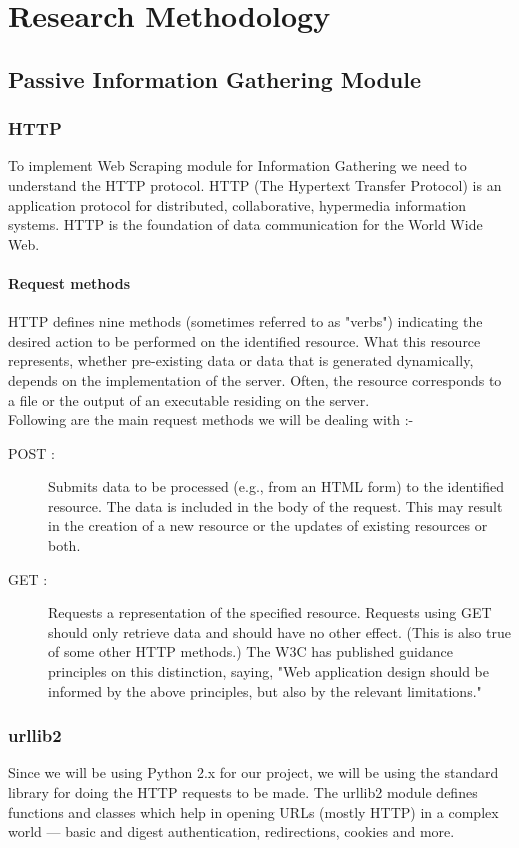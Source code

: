 \chapter{Research Methodology}

\section{Passive Information Gathering Module}

\subsection{HTTP}
To implement Web Scraping module for Information Gathering we need to understand the HTTP protocol. HTTP (The Hypertext Transfer 
Protocol) is an application protocol for distributed, collaborative, hypermedia information systems. HTTP is the 
foundation of data communication for the World Wide Web.

\subsubsection{Request methods}
HTTP defines nine methods (sometimes referred to as "verbs") indicating the desired action to be performed on the identified 
resource. What this resource represents, whether pre-existing data or data that is generated dynamically, depends on the 
implementation of the server. Often, the resource corresponds to a file or the output of an executable residing on the server.\\[0.5cm]
Following are the main request methods we will be dealing with :-
\begin{description}
\item[POST : ] Submits data to be processed (e.g., from an HTML form) to the identified resource. The data is included in the body of the request. This may result in the creation of a new resource or the updates of existing resources or both.
\item[GET : ] Requests a representation of the specified resource. Requests using GET should only retrieve data and should have no other 
effect. (This is also true of some other HTTP methods.) The W3C has published guidance principles on this distinction, saying, 
"Web application design should be informed by the above principles, but also by the relevant limitations."
\end{description}

\subsection{urllib2}
Since we will be using Python 2.x for our project, we will be using the standard library for doing the HTTP requests to be made.
The urllib2 module defines functions and classes which help in opening URLs (mostly HTTP) in a complex world — basic and digest authentication, redirections, cookies and more.\cite{py_urllib2}

